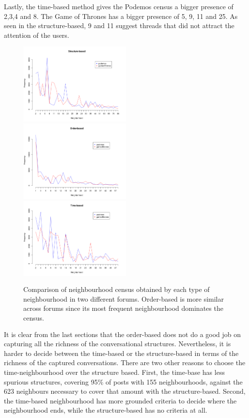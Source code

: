 \documentclass[conference]{IEEEtran}
\begin{document}
Lastly, the time-based method gives the Podemos census a bigger presence of  2,3,4 and 8. The Game of Thrones has a bigger presence of 5, 9, 11 and 25.  As seen in the structure-based, 9 and 11 suggest threads that did not attract the attention of the users.

\begin{figure}
\centering
\includegraphics[width=0.5\textwidth]{structure_based_census}
\includegraphics[width=0.5\textwidth]{order_based_census}
\includegraphics[width=0.5\textwidth]{time_based_census}
\caption{Comparison of neighbourhood census obtained by each type of neighbourhood in two different forums. Order-based is more similar across forums since its most frequent neighbourhood dominates the census.}
\label{fig:census_compare}
\end{figure}

It is clear from the last sections that the order-based does not do a good job on capturing all the richness of the conversational structures. Nevertheless, it is harder to decide between the time-based or the structure-based in terms of the richness of the captured conversations. There are two other reasons to choose the time-neighbourhood over the structure based. First, the time-base has less spurious structures, covering 95\% of posts with 155 neighbourhoods, against the 623 neighbours necessary to cover that amount with the structure-based. Second, the time-based neighbourhood has more grounded criteria to decide where the neighbourhood ends, while the structure-based has no criteria at all.
\end{document}
